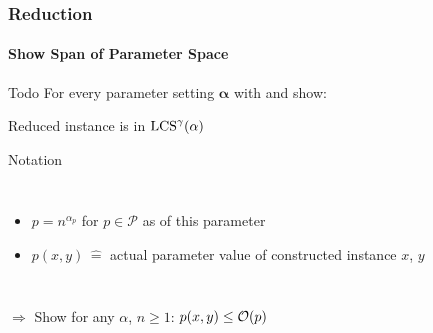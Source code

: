 \begin{frame}
\frametitle{Reduction}
\framesubtitle{Show Span of Parameter Space}

\begin{alertblock}{Todo}
    For every parameter setting $\mathbf{\alpha}$ with  and  show:
    
    Reduced instance is in $\text{LCS}^\gamma(\mathbb{\alpha})$
\end{alertblock}


\pause

\begin{exampleblock}{Notation}
    \begin{columns}
	\begin{itemize}
		\item $p = n^{\alpha_p}$ for $p \in \mathcal{P}$ as  of this parameter
		\item $p(x,y)\, \hat{=}$ actual parameter value of constructed instance $x$, $y$
	\end{itemize}
    \end{columns}

	\vspace{2ex}    
    
    $\Rightarrow$ Show for any $\alpha$, $n \geq 1$: \quad\quad\quad $p(x,y) \leq \mathcal{O}(p)$
\end{exampleblock}

\end{frame}



